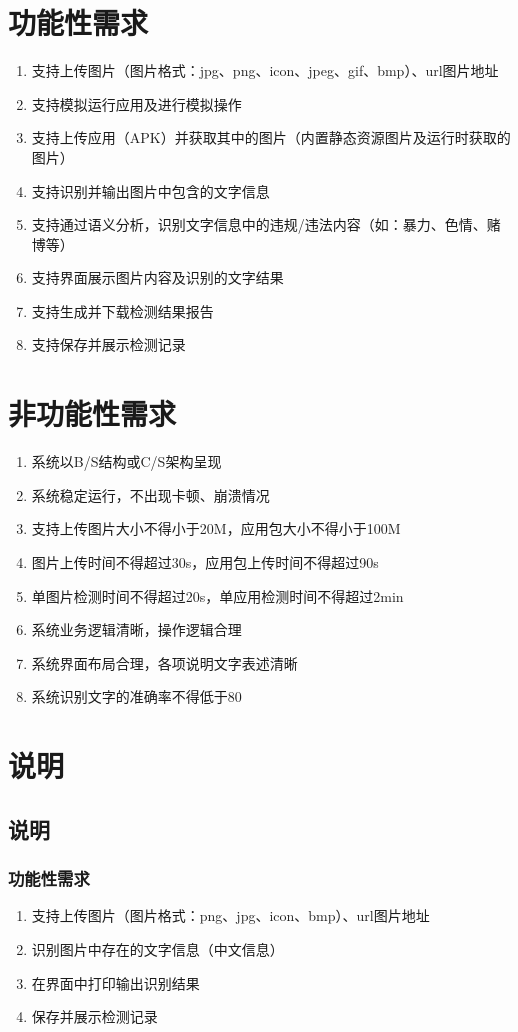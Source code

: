 \documentclass[UTF8]{ctexart}
\begin{document}
	\section{功能性需求}
		\begin{enumerate}
			\item 支持上传图片（图片格式：jpg、png、icon、jpeg、gif、bmp）、url图片地址
			\item 支持模拟运行应用及进行模拟操作
			\item 支持上传应用（APK）并获取其中的图片（内置静态资源图片及运行时获取的图片）
			\item 支持识别并输出图片中包含的文字信息
			\item 支持通过语义分析，识别文字信息中的违规/违法内容（如：暴力、色情、赌博等）
			\item 支持界面展示图片内容及识别的文字结果
			\item 支持生成并下载检测结果报告
			\item 支持保存并展示检测记录
		\end{enumerate}
	
	\section{非功能性需求}
		\begin{enumerate}
			\item 系统以B/S结构或C/S架构呈现
			\item 系统稳定运行，不出现卡顿、崩溃情况
			\item 支持上传图片大小不得小于20M，应用包大小不得小于100M
			\item 图片上传时间不得超过30s，应用包上传时间不得超过90s
			\item 单图片检测时间不得超过20s，单应用检测时间不得超过2min
			\item 系统业务逻辑清晰，操作逻辑合理
			\item 系统界面布局合理，各项说明文字表述清晰
			\item 系统识别文字的准确率不得低于80%
		\end{enumerate}
		
	\section{说明}
		\subsection{说明}
			\subsubsection{功能性需求}
				\begin{enumerate}
					\item 支持上传图片（图片格式：png、jpg、icon、bmp）、url图片地址
					\item 识别图片中存在的文字信息（中文信息）
					\item 在界面中打印输出识别结果
					\item 保存并展示检测记录
				\end{enumerate}
	
\end{document}
